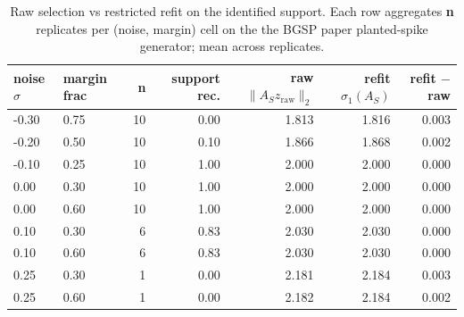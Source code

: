 \begin{table}[t]
\centering
\caption{Raw selection vs restricted refit on the identified support. Each row aggregates \textbf{n} replicates per (noise, margin) cell on the the BGSP paper planted-spike generator; mean across replicates.}
\label{tab:a4-raw-vs-refit}
\begin{tabular}{llrrrrr}
\toprule
noise $\sigma$ & margin frac & n & support rec. & raw $\|A_S z_{\mathrm{raw}}\|_2$ & refit $\sigma_1(A_S)$ & refit $-$ raw \\
\midrule
-0.30 & 0.75 & 10 & 0.00 & 1.813 & 1.816 & 0.003 \\
-0.20 & 0.50 & 10 & 0.10 & 1.866 & 1.868 & 0.002 \\
-0.10 & 0.25 & 10 & 1.00 & 2.000 & 2.000 & 0.000 \\
0.00 & 0.30 & 10 & 1.00 & 2.000 & 2.000 & 0.000 \\
0.00 & 0.60 & 10 & 1.00 & 2.000 & 2.000 & 0.000 \\
0.10 & 0.30 & 6 & 0.83 & 2.030 & 2.030 & 0.000 \\
0.10 & 0.60 & 6 & 0.83 & 2.030 & 2.030 & 0.000 \\
0.25 & 0.30 & 1 & 0.00 & 2.181 & 2.184 & 0.003 \\
0.25 & 0.60 & 1 & 0.00 & 2.182 & 2.184 & 0.002 \\
\bottomrule
\end{tabular}
\end{table}

